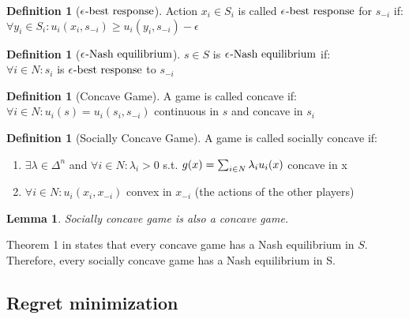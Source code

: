 \documentclass[11pt]{article}
\newtheorem{lemma}[theorem]{Lemma}
\theoremstyle{definition}
\newtheorem{definition}[theorem]{Definition}
\theoremstyle{definition}
\begin{document}
\begin{definition}[$\epsilon^{}\text{-best response}$]
	Action $x_i \in S_i$ is called $\epsilon^{}\text{-best response}$ for $s_{-i}$ 
if:\\
	\indent$\forall y_i \in S_i : u_i(x_i, s_{-i}) \geq u_i(y_i, s_{-i}) - \epsilon$\\
\end{definition}

\begin{definition}[$\epsilon^{}\text{-Nash equilibrium}$]
	$s \in S$ is $\epsilon^{}\text{-Nash equilibrium}$ if:\\
	\indent$\forall i \in N : s_i$ is $\epsilon^{}\text{-best response}$ to $s_{-i}$\\
\end{definition}


\begin{definition}[Concave Game]\label{ccg}
	A game is called concave if:\\
	\indent$\forall i \in N: u_i(s) = u_i(s_i,s_{-i})$ continuous in $s$ and concave in $s_i$\\
\end{definition}

\begin{definition}[Socially Concave Game]\label{sccg}
	A game is called socially concave if:
	\begin{enumerate}
		\item
			$\exists \lambda \in \Delta^n$ and $\forall i \in N: \lambda_i > 0$ s.t. $g(x) = \sum_{i \in N} \lambda_i u_i(x)$ concave in x
		\item
			$\forall i \in N: u_i(x_i,x_{-i})$ convex in $x_{-i}$ (the actions of the other players)\\
	\end{enumerate}
\end{definition}

\begin{lemma}\label{soco}
	Socially concave game is also a concave game.\\
\end{lemma}

Theorem 1 in \cite{concaveg} states that every concave game has a Nash equilibrium in $S$.
Therefore, every socially concave game has a Nash equilibrium in S.






\setlength{\parindent}{0cm}
\subsection{Regret minimization}
\end{document}
